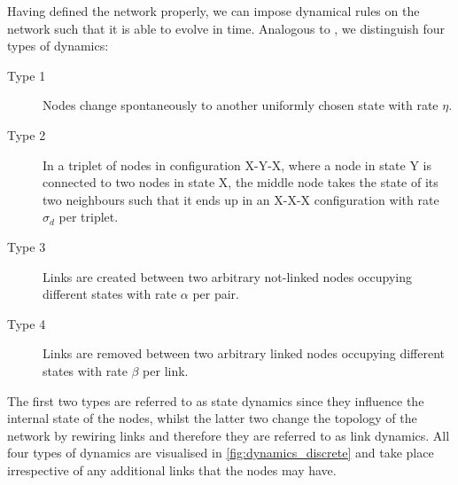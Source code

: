 Having defined the network properly, we can impose dynamical rules on the network such that it is able to evolve in time. Analogous to \cite{Chen2016}, we distinguish four types of dynamics:
\begin{description}
	\item [Type 1] Nodes change spontaneously to another uniformly chosen state with rate $\eta$.
	\item [Type 2] In a triplet of nodes in configuration X-Y-X, where a node in state Y is connected to two nodes in state X, the middle node takes the state of its two neighbours such that it ends up in an X-X-X configuration with rate $\sigma_d$ per triplet. 
	\item [Type 3] Links are created between two arbitrary not-linked nodes occupying different states with rate $\alpha$ per pair.
	\item [Type 4] Links are removed between two arbitrary linked nodes occupying different states with rate $\beta$ per link.
\end{description}
The first two types are referred to as state dynamics since they influence the internal state of the nodes, whilst the latter two change the topology of the network by rewiring links and therefore they are referred to as link dynamics. All four types of dynamics are visualised in \cref{fig:dynamics_discrete} and take place irrespective of any additional links that the nodes may have. 
